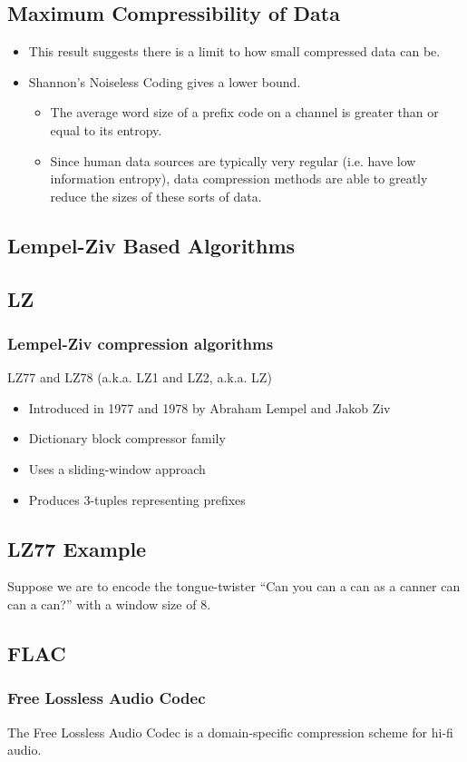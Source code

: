 \documentclass[mathserif,notheorems]{beamer} %
\begin{document}
\begin{frame}
  \subsection{Maximum Compressibility of Data}
  \begin{itemize}
  \item This result suggests there is a limit to how small compressed
    data can be.
  \item Shannon's Noiseless Coding gives a lower bound.
    \begin{itemize}
    \item The average word size of a prefix code on a channel is
      greater than or equal to its entropy.
    \item Since human data sources are typically very regular
      (i.e. have low information entropy), data compression methods
      are able to greatly reduce the sizes of these sorts of data.
    \end{itemize}
  \end{itemize}
\end{frame}

\begin{frame}
  \section{Lempel-Ziv Based Algorithms}
  \subsection{LZ}
  \frametitle{Lempel-Ziv compression algorithms}
  LZ77 and LZ78 (a.k.a. LZ1 and LZ2, a.k.a. LZ)
  \begin{itemize}
  \item Introduced in 1977 and 1978 by Abraham Lempel and Jakob Ziv
  \item Dictionary block compressor family
  \item Uses a sliding-window approach
  \item Produces 3-tuples representing prefixes
  \end{itemize}
\end{frame}

\begin{frame}
  \subsection{LZ77 Example}
  Suppose we are to encode the tongue-twister ``Can you can a can as a
  canner can can a can?'' with a window size of 8.
\end{frame}

\begin{frame}
  \section{FLAC}
  \frametitle{Free Lossless Audio Codec}
  The Free Lossless Audio Codec is a domain-specific compression
  scheme for hi-fi audio.
\end{frame}
\end{document}
